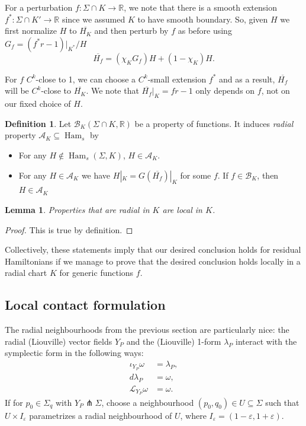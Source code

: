 \documentclass{amsart}
\newcommand{\Acal}{{\mathcal{A}}}
\newcommand{\Bcal}{{\mathcal{B}}}
\newcommand{\Lcal}{{\mathcal{L}}}
\newcommand{\RR}{\mathbb{R}}
\newcommand{\Ham}{\operatorname{Ham}}
\newtheorem{lemma}[proposition]{Lemma}
\theoremstyle{definition}
\newtheorem{definition}[proposition]{Definition}
\theoremstyle{remark}
\numberwithin{equation}{section}
\begin{document}
For a perturbation $f:\Sigma\cap K\to \RR$, we note that there is a smooth extension $f^*:\Sigma\cap K'\to \RR$ since we assumed $K$ to have smooth boundary. So, given $H$ we first normalize $H$ to $\overline{H_K}$ and then perturb by $f$ as before using $G_f= (f^*r-1)|_{K^*}/H$
$$\overline{H_f}=(\chi_K G_f) H + (1-\chi_K) H.$$

For $f$ $C^k$-close to 1, we can choose a $C^k$-small extension $f^*$ and as a result, $\overline{H_f}$ will be $C^k$-close to $\overline{H_K}$. We note that $\overline{H_f}|_K= fr-1$ only depends on $f$, not on our fixed choice of $H$. 
\begin{definition}\label{def:radialProperty}
    Let $\Bcal_K(\Sigma\cap K,\RR)$ be a property of functions. It induces \emph{radial} property $\Acal_K\subseteq \Ham_s$ by
    \begin{itemize}
        \item For any $H\notin\Ham_s(\Sigma,K)$, $H\in\Acal_K$.
        \item For any $H\in\Acal_K$ we have $H|_K= G (\overline{H_f})|_K$ for some $f$. If $f\in \Bcal_K$, then $H\in\Acal_K$
    \end{itemize}    
\end{definition}
\begin{lemma}
    Properties that are radial in $K$ are local in $K$. 
\end{lemma}
\begin{proof}
    This is true by definition.
\end{proof}
Collectively, these statements imply that our desired conclusion holds for residual Hamiltonians if we manage to prove that the desired conclusion holds locally in a radial chart $K$ for generic functions $f$.

\subsection{Local contact formulation}\label{subsec:ContactFormulation}

The radial neighbourhoods from the previous section are particularly nice: the radial (Liouville) vector fields $Y_P$ and the (Liouville) 1-form $\lambda_P$ interact with the symplectic form in the following ways:
\begin{align*}
    \iota_{Y_P}\omega &=\lambda_P,\\
    d\lambda_P&=\omega,\\
    \Lcal_{Y_P}\omega &=\omega.
\end{align*}
If for $p_0\in \Sigma_q$ with $Y_P\pitchfork \Sigma$, choose a neighbourhood $(p_0,q_0)\in U\subseteq \Sigma$ such that $U\times I_\varepsilon$ parametrizes a radial neighbourhood of $U$, where $I_\varepsilon= (1-\varepsilon,1+\varepsilon)$. 
\end{document}
